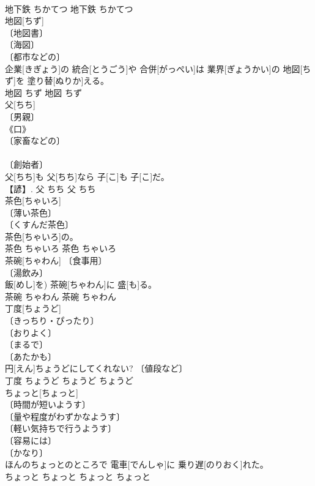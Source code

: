 \documentclass[8pt]{extreport}
\begin{document}
\begin{CJK}{UTF8}{min}
\\	地下鉄	ちかてつ	地下鉄	ちかてつ	
\\	地図[ちず]	
\\	〔地図書〕 
\\	〔海図〕 
\\	〔都市などの〕 
\\	企業[きぎょう]の 統合[とうごう]や 合併[がっぺい]は 業界[ぎょうかい]の 地図[ちず]を 塗り替[ぬりか]える。	
\\	地図	ちず	地図	ちず	
\\	父[ちち]	
\\	〔男親〕 
\\	《口》 
\\	〔家畜などの〕 
\\	[⇒ちちおや] 
\\	〔創始者〕 
\\	父[ちち]も 父[ちち]なら 子[こ]も 子[こ]だ。	
\\	【諺】.	父	ちち	父	ちち	
\\	茶色[ちゃいろ]	
\\	〔薄い茶色〕 
\\	〔くすんだ茶色〕 
\\	茶色[ちゃいろ]の。	
\\	茶色	ちゃいろ	茶色	ちゃいろ	
\\	茶碗[ちゃわん]	〔食事用〕 
\\	〔湯飲み〕 
\\	飯[めし]を) 茶碗[ちゃわん]に 盛[も]る。	
\\	茶碗	ちゃわん	茶碗	ちゃわん	
\\	丁度[ちょうど]	
\\	〔きっちり・ぴったり〕 
\\	〔おりよく〕 
\\	〔まるで〕 
\\	〔あたかも〕 
\\	円[えん]ちょうどにしてくれない?	〔値段など〕 
\\	丁度	ちょうど	ちょうど	ちょうど	
\\	ちょっと[ちょっと]	
\\	〔時間が短いようす〕 
\\	〔量や程度がわずかなようす〕 
\\	〔軽い気持ちで行うようす〕 
\\	〔容易には〕 
\\	〔かなり〕 
\\	ほんのちょっとのところで 電車[でんしゃ]に 乗り遅[のりおく]れた。	
\\	ちょっと	ちょっと	ちょっと	ちょっと	

\end{CJK}
\end{document}
